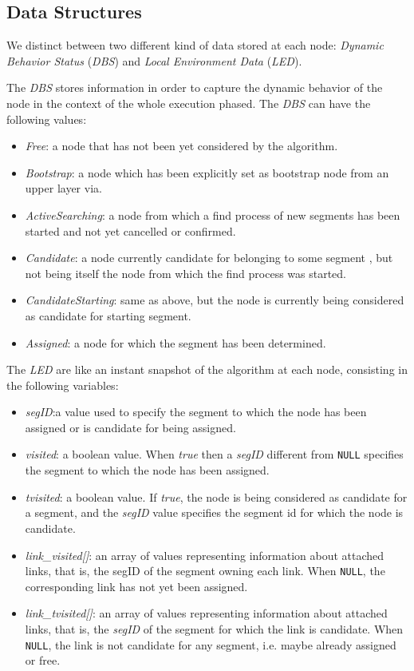 \subsection{\disr{} Data Structures}
\label{ssec:disr_data}

We distinct between two different kind of data stored at each node:
\emph{Dynamic Behavior Status} (\emph{DBS}) and \emph{Local
Environment Data} (\emph{LED}).

The \emph{DBS} stores information in order to capture the dynamic
behavior of the node  in the context of the whole
\disr{} execution phased. The \emph{DBS} can have the following values:

\begin{itemize}
\item{\emph{Free}}: a node that has  not been yet considered  by the \disr{} algorithm.
\item{\emph{Bootstrap}}: a node which has been explicitly set as bootstrap node from
an upper layer via. 
\item{\emph{ActiveSearching}}: a node from which a find process of new segments has
been started and not yet cancelled or confirmed. 
\item{\emph{Candidate}}: a node currently candidate for belonging to some segment
, but not being itself the node from which the find process was started. 
\item{\emph{CandidateStarting}}: same as above, but the node is currently being considered as candidate
for starting segment. 
\item{\emph{Assigned}}: a node for which the segment has been determined.  
\end{itemize}

The \emph{LED} are like an instant snapshot of the \disr{} algorithm at each node,
consisting in the following variables:
\begin{itemize}
\item{\emph{segID}}:a value used to specify the segment to which the
node has been assigned or is candidate for being assigned.
\item{\emph{visited}}: a boolean value. When \emph{true}
then a \emph{segID} different from \texttt{NULL} specifies the segment 
to which the node has been assigned. 
\item{\emph{tvisited}}: a boolean value. If \emph{true}, the node is
being considered as candidate for a segment, and the \emph{segID} value
specifies the segment id for which the node is candidate. 
\item{\emph{link\_visited[]}}: an array
of values representing information about attached links, that is, the
segID of the segment owning each link. When \texttt{NULL}, the corresponding link has not yet been
assigned.
\item{\emph{link\_tvisited[]}}: an array of
values representing information about attached links, that is, the \emph{segID} of
the segment for which the link is candidate. When \texttt{NULL}, the link is
not candidate for any segment, i.e. maybe already assigned
or free.
\end{itemize}

